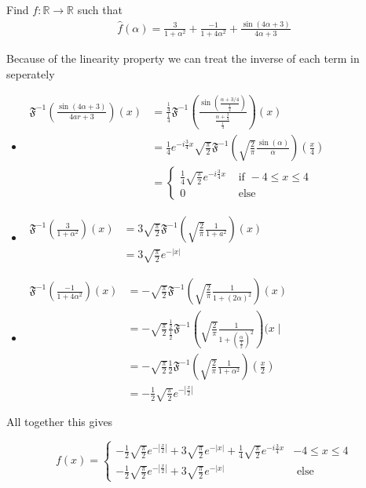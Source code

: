 \documentclass[11pt]{article}
\begin{document}
\begin{exercise}
    Find $f : \mathbb R \to \mathbb R$ such that 
    \begin{align*}
        \hat f(\alpha) = \frac{3}{1+\alpha^{2}} + \frac{-1}{1+4\alpha^{2}} + \frac{ \sin( 4 \alpha + 3 ) }{ 4 \alpha + 3 }
    \end{align*}
\end{exercise}
\begin{solution}   Because of the linearity property we can treat the inverse of each term in seperately
 \begin{itemize}
\item $\begin{aligned} \mathfrak{F}^{-1}\left(\frac{\sin (4 \alpha+3)}{4 a r+3}\right)(x) & =\frac{\frac{1}{4}}{\frac{1}{4}} \mathfrak{F}^{-1}\left(\frac{\sin \left(\frac{\alpha+3 / 4}{\frac{1}{4}}\right)}{\frac{\alpha+\frac{3}{4}}{\frac{1}{4}}}\right)(x) \\ & =\frac{1}{4} e^{-i \frac{3}{4} x} \sqrt{\frac{\pi}{2}} \mathfrak{F}^{-1}\left(\sqrt{\frac{2}{\pi}} \frac{\sin (\alpha)}{\alpha}\right)\left(\frac{x}{4}\right) \\ & = \begin{cases}\frac{1}{4} \sqrt{\frac{\pi}{2}} e^{-i \frac{3}{4} x} & \text { if }-4 \leq x \leq 4 \\ 0 & \text { else }\end{cases} \end{aligned}$
\item $\begin{aligned} \mathfrak{F}^{-1}\left(\frac{3}{1+\alpha^2}\right)(x) & =3 \sqrt{\frac{\pi}{2}} \mathfrak{F}^{-1}\left(\sqrt{\frac{2}{\pi}} \frac{1}{1+a^2}\right)(x) \\ & =3 \sqrt{\frac{\pi}{2}} e^{-|x|}\end{aligned}$
\item $\begin{aligned} \mathfrak{F}^{-1}\left(\frac{-1}{1+4 \alpha^2}\right)(x) & =-\sqrt{\frac{\pi}{2}} \mathfrak{F}^{-1}\left(\sqrt{\frac{2}{\pi}} \frac{1}{1+(2 \alpha)^2}\right)(x) \\ & =-\sqrt{\frac{\pi}{2}} \frac{\frac{1}{2}}{\frac{1}{2}} \mathfrak{F}^{-1}\left(\sqrt{\frac{2}{\pi}} \frac{1}{1+\left(\frac{\alpha}{\frac{1}{2}}\right)^2}\right)(x \mid \\ & =-\sqrt{\frac{\pi}{2}} \frac{1}{2} \mathfrak{F}^{-1}\left(\sqrt{\frac{2}{\pi}} \frac{1}{1+\alpha^2}\right)\left(\frac{x}{2}\right) \\ & =-\frac{1}{2} \sqrt{\frac{\pi}{2}} e^{-\left|\frac{x}{2}\right|}\end{aligned}$
\end{itemize}

All together this gives

$$
f(x) = \begin{cases}-\frac{1}{2} \sqrt{\frac{\pi}{2}} e^{-\left|\frac{x}{2}\right|}+3 \sqrt{\frac{\pi}{2}} e^{-|x|}+\frac{1}{4} \sqrt{\frac{\pi}{2}} e^{-i \frac{3}{4} x} & -4 \leq x \leq 4 \\ -\frac{1}{2} \sqrt{\frac{\pi}{2}} e^{-\left|\frac{x}{2}\right|}+3 \sqrt{\frac{\pi}{2}} e^{-|x|} & \text { else }\end{cases}
$$
\end{solution}
\end{document}

